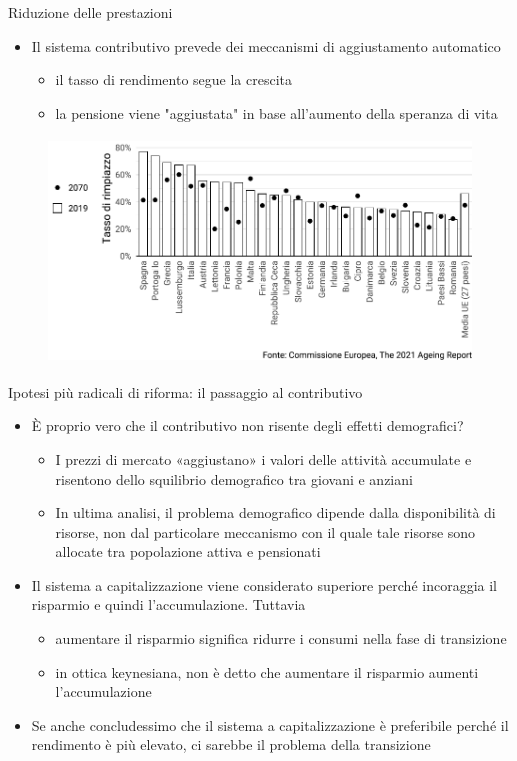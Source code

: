 \documentclass[11pt]{beamer}
\begin{document}
\begin{frame}{Riduzione delle prestazioni}
\begin{itemize}
\item Il sistema contributivo prevede dei meccanismi di aggiustamento automatico
\begin{itemize}
\item il tasso di rendimento segue la crescita
\item la pensione viene "aggiustata" in base all'aumento della speranza di vita
\end{itemize}
\end{itemize}


\begin{figure}[htbp]
\centering
\includegraphics[height=6cm]{./figure/tassi-rimpiazzo-2019-2070.pdf}
\end{figure}
\end{frame}

\begin{frame}{Ipotesi più radicali di riforma: il passaggio al contributivo}
\begin{itemize}
\item È proprio vero che il contributivo non risente degli effetti demografici?
\begin{itemize}
\item I prezzi di mercato «aggiustano» i valori delle attività accumulate e risentono dello squilibrio demografico tra giovani e anziani
\item In ultima analisi, il problema demografico dipende dalla disponibilità di risorse, non dal particolare meccanismo con il quale tale risorse sono allocate tra popolazione attiva e pensionati
\end{itemize}
\item Il sistema a capitalizzazione viene considerato superiore perché incoraggia il risparmio e quindi l'accumulazione. Tuttavia
\begin{itemize}
\item aumentare il risparmio significa ridurre i consumi nella fase di transizione
\item in ottica keynesiana, non è detto che aumentare il risparmio aumenti l'accumulazione
\end{itemize}
\item Se anche concludessimo che il sistema a capitalizzazione è preferibile perché il rendimento è più elevato, ci sarebbe il problema della transizione
\end{itemize}
\end{frame}
\end{document}
